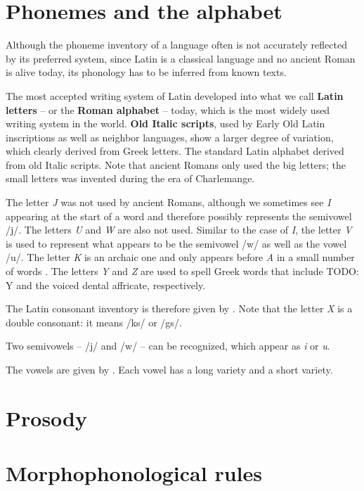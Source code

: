 \documentclass[a4paper, oneside, 12pt]{report}
\newcommand*{\citechap}[1]{chap.~{#1}}
\newcommand*{\citetable}[1]{Table~{#1}}
\newcommand*{\concept}[1]{\textbf{#1}}
\newcommand{\form}[1]{\emph{#1}}
\begin{document}
\section{Phonemes and the alphabet}

Although the phoneme inventory of a language 
often is not accurately reflected by its preferred system, 
since Latin is a classical language 
and no ancient Roman is alive today, 
its phonology has to be inferred from known texts. 

The most accepted writing system of Latin developed into 
what we call \concept{Latin letters} -- or the \concept{Roman alphabet} -- today, 
which is the most widely used writing system in the world.
\concept{Old Italic scripts},
used by Early Old Latin inscriptions 
as well as neighbor languages,
show a larger degree of variation, 
which clearly derived from Greek letters.
The standard Latin alphabet derived from old Italic scripts.
Note that ancient Romans only used the big letters;
the small letters was invented during the era of Charlemange.

The letter \form{J} was not used by ancient Romans, 
although we sometimes see \form{I} appearing at the start of a word 
and therefore possibly represents the semivowel /j/.
The letters \form{U} and \form{W} are also not used.
Similar to the case of \form{I},
the letter \form{V} is used to represent 
what appears to be the semivowel /w/ 
as well as the vowel /u/. 
The letter \form{K} is an archaic one 
and only appears before \form{A} in a small number of words
\citep[\citechap{2}]{oniga2014latin}.
The letters \form{Y} and \form{Z} are used to spell Greek words that 
include TODO: Y and the voiced dental affricate, respectively.

The Latin consonant inventory is therefore given by \citet[\citetable{3.1}]{oniga2014latin}.
Note that the letter \form{X} is a double consonant: 
it means /ks/ or /gs/.

Two semivowels -- /j/ and /w/ -- can be recognized,
which appear as \form{i} or \form{u}.

The vowels are given by \citet[\citetable{3.2}]{oniga2014latin}.
Each vowel has a long variety and a short variety.

\section{Prosody}



\section{Morphophonological rules}\label{sec:phonology.morphological}
\end{document}
